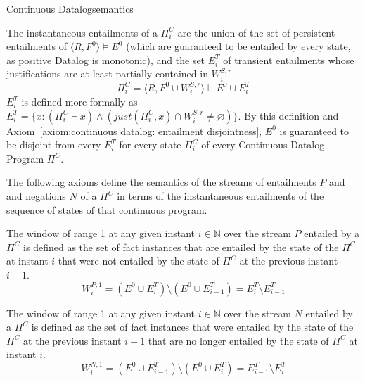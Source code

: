 \begin{nestedsection}{Continuous Datalog}{semantics}
\begin{definition}[State of a $\Pi^C$]
The instantaneous entailments of a $\Pi^C_i$ are the union of the set of
persistent entailments of ${\langle R, F^0 \rangle \vDash E^0}$ (which are
guaranteed to be entailed by every state, as positive Datalog is monotonic),
and the set $E^T_{i}$ of transient entailments whose justifications are at
least partially contained in $W^{S,r}_i$.
\begin{equation*}
\Pi^C_i = \langle R, F^0 \cup W^{S,r}_{i} \rangle \vDash E^0 \cup E^T_{i}
\end{equation*}
$E^T_i$ is defined more formally as
${E^T_{i} = \{ x : \left( \Pi^C_i \vdash x \right) \wedge
\left( just(\Pi^C_i,x) \cap W^{S,r}_i \neq \varnothing \right) \}}$.
By this definition and Axiom~\ref{axiom:continuous datalog: entailment disjointness},
$E^0$ is guaranteed to be disjoint from every $E^T_i$
for every state $\Pi^C_i$ of every Continuous Datalog Program $\Pi^C$.
\end{definition}

The following axioms define the semantics of the streams of
entailments $P$ and and negations $N$ of a $\Pi^C$ in terms of the
instantaneous entailments of the sequence of states of that continuous
program.

\begin{axiom}
\label{axiom:continuous datalog: positive window increment}
The window of range 1 at any given instant ${i \in \mathbb{N}}$ over
the stream $P$ entailed by a $\Pi^C$ is defined as the set of fact instances
that are entailed by the state of the $\Pi^C$ at instant $i$ that were
not entailed by the state of $\Pi^C$ at the previous instant ${i-1}$.
\begin{equation*}
W^{P,1}_{i} = \left( E^0 \cup E^T_{i} \right) \setminus
\left( E^0 \cup E^T_{i-1} \right) = E^T_{i} \setminus E^T_{i-1}
\end{equation*}
\end{axiom}
\begin{axiom}
\label{axiom:continuous datalog: negative window increment}
The window of range 1 at any given instant ${i \in \mathbb{N}}$ over
the stream $N$ entailed by a $\Pi^C$ is defined as the set of fact instances
that were entailed by the state of the $\Pi^C$ at the previous instant
${i-1}$ that are no longer entailed by the state of $\Pi^C$ at instant $i$.
\begin{equation*}
W^{N,1}_{i} = \left( E^0 \cup E^T_{i-1} \right) \setminus
\left( E^0 \cup E^T_{i} \right) = E^T_{i-1} \setminus E^T_{i}
\end{equation*}
\end{axiom}


\end{nestedsection}
